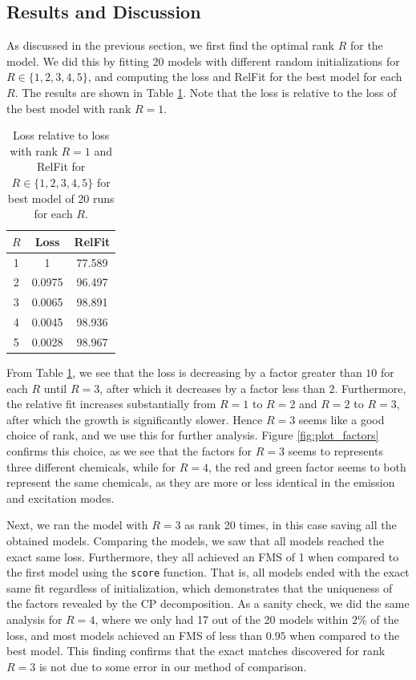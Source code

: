 \subsection*{Results and Discussion}
As discussed in the previous section, we first find the optimal rank $R$ for the model.
We did this by fitting 20 models with different random initializations for $R \in \{1,2,3,4,5\}$, and computing the loss and RelFit for the best model for each $R$.
The results are shown in Table \ref{tab:rank_choice}.
Note that the loss is relative to the loss of the best model with rank $R=1$.

\begin{table}[H]
    \centering
    \begin{tabular}{|c|c|c|}
    \hline
    $R$ & Loss & RelFit \\
    \hline
    1 & 1 & 77.589 \\
    \hline
    2 & 0.0975 & 96.497 \\
    \hline
    3 & 0.0065 & 98.891 \\
    \hline
    4 & 0.0045 & 98.936 \\
    \hline
    5 & 0.0028 & 98.967 \\
    \hline
    \end{tabular}
    \caption{Loss relative to loss with rank $R=1$ and RelFit for $R\in \{1,2,3,4,5\}$ for best model of 20 runs for each $R$.}
    \label{tab:rank_choice}
\end{table}

From Table \ref{tab:rank_choice}, we see that the loss is decreasing by a factor greater than $ 10$ for each $R$ until $R=3$, after which it decreases by a factor less than $ 2$.
Furthermore, the relative fit increases substantially from $R=1$ to $R=2$ and $R=2$ to $R=3$, after which the growth is significantly slower.
Hence $R=3$ seems like a good choice of rank, and we use this for further analysis.
Figure \ref{fig:plot_factors} confirms this choice, as we see that the factors for $R=3$ seems to represents three different chemicals, while for $R=4$, the red and green factor seems to both represent the same chemicals, as they are more or less identical in the emission and excitation modes.

Next, we ran the model with $R = 3$ as rank 20 times, in this case saving all the obtained models.
Comparing the models, we saw that all models reached the exact same loss.
Furthermore, they all achieved an FMS of 1 when compared to the first model using the \texttt{score} function.
That is, all models ended with the exact same fit regardless of initialization, which demonstrates that the uniqueness of the factors revealed by the CP decomposition.
As a sanity check, we did the same analysis for $R=4$, where we only had 17 out of the 20 models within 2\% of the loss, and most models achieved an FMS of less than $0.95$ when compared to the best model.
This finding confirms that the exact matches discovered for rank $R=3$ is not due to some error in our method of comparison.

